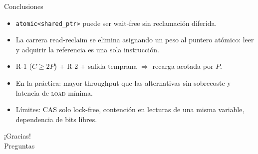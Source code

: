 \documentclass[aspectratio=169,11pt,xcolor=table]{beamer}
\begin{document}
\begin{frame}{Conclusiones}
  \begin{itemize}
    \item<1-> \texttt{atomic<shared\_ptr>} puede ser \alert{wait-free sin reclamación diferida}.
    \item<2-> La carrera read-reclaim se elimina asignando un \alert{peso} al puntero atómico: leer y adquirir la referencia es una sola instrucción.
    \item<3-> R-1 ($C\geq2P$) + R-2 + salida temprana $\Rightarrow$ recarga acotada por $P$.
    \item<4-> En la práctica: \alert{mayor throughput} que las alternativas sin sobrecoste y \alert{latencia de \textsc{load} mínima}.
    \item<5-> Límites: CAS solo lock-free, contención en lecturas de una misma variable, dependencia de bits libres.
  \end{itemize}
  \vspace{3mm}
\end{frame}

\begin{frame}[plain]
  \centering
  \vspace*{20mm}
  {\Huge\color{azul} ¡Gracias!}\\[6mm]
  {\large Preguntas}
\end{frame}
\end{document}
